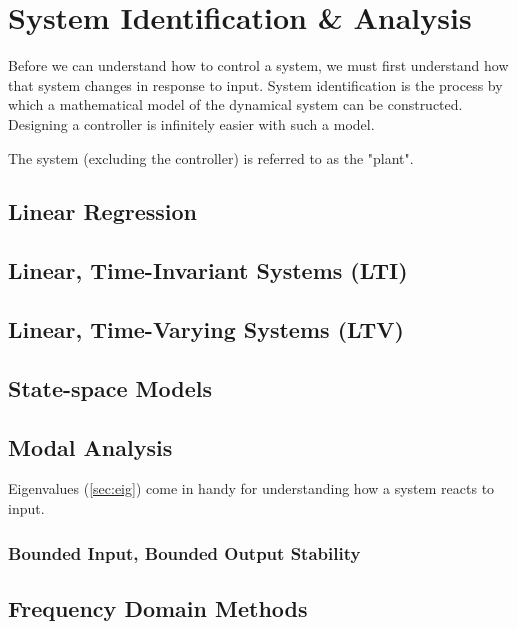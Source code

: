 \documentclass[../notes.tex]{subfiles}
\begin{document}
\section{System Identification \& Analysis}
Before we can understand how to control a system, we must first understand how that system changes in response to input. System identification is the process by which a mathematical model of the dynamical system can be constructed. Designing a controller is infinitely easier with such a model. 
\begin{emphasis}
    The system (excluding the controller) is referred to as the "plant".
\end{emphasis}

\subsection{Linear Regression}
\subsection{Linear, Time-Invariant Systems (LTI)}
\subsection{Linear, Time-Varying Systems (LTV)}
\subsection{State-space Models}
\subsection{Modal Analysis}
Eigenvalues (\underline{\ref{sec:eig}}) come in handy for understanding how a system reacts to input.
\subsubsection{Bounded Input, Bounded Output Stability}

\subsection{Frequency Domain Methods}
\end{document}
